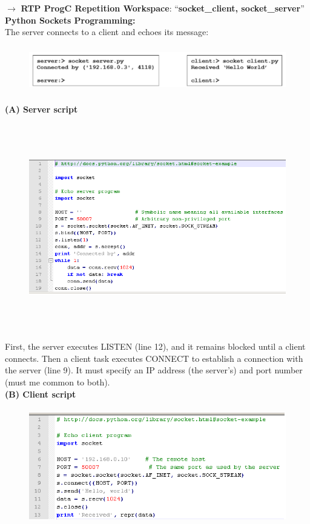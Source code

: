 $\rightarrow$ \textbf{ RTP ProgC Repetition Workspace}: ``\textbf{socket\_client, socket\_server}''\\

{\rot\bf Python Sockets Programming:}\\

The server connects to a client and echoes its message:

 	\begin{figure}[h]
    \centering
    \includegraphics[width=14cm, height=2cm]{Images/image188.png}
    \label{fig:Fig 64}
    \end{figure}
\newpage  
\textbf{(A) Server script }

 	\begin{figure}[h]
    \centering
    \includegraphics[width=16cm, height=9cm]{Images/image20.png}
    \label{fig:Fig 65}
    \end{figure}
   
First, the server executes LISTEN (line 12), and it remains blocked until a client connects. Then a client task executes CONNECT to establish a connection with the server (line 9). It must specify an IP address (the server's) and port number (must me common to both).\\

\textbf{(B) Client script }

 	\begin{figure}[h]
    \centering
    \includegraphics[width=16cm, height=5cm]{Images/image118.png}
    \label{fig:Fig 66}
    \end{figure}

